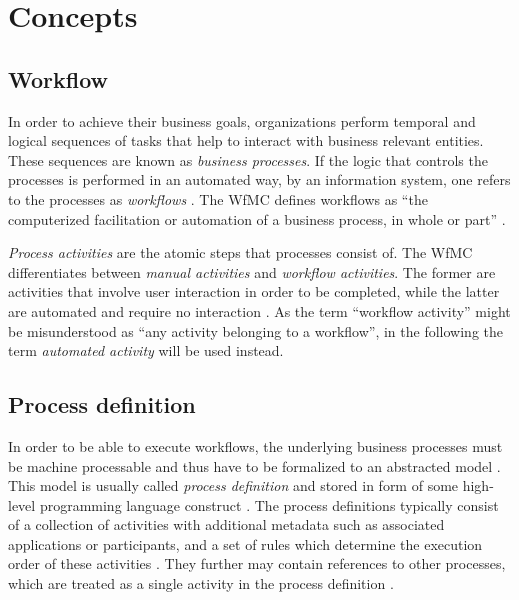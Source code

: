 
\section{Concepts} %
\label{sec:concepts}

  \subsection{Workflow} %
  \label{sub:workflow}
    In order to achieve their business goals, organizations perform temporal and logical sequences of tasks that help to interact with business relevant entities. These sequences are known as \emph{business processes}. If the logic that controls the processes is performed in an automated way, \eg by an information system, one refers to the processes as \emph{workflows} \cite{Becker1999Identifying,Hollingsworth1995Wfmc}. The \ac{WfMC} defines workflows as ``the computerized facilitation or automation of a business process, in whole or part'' \cite{Hollingsworth1995Wfmc}.

    \emph{Process activities} are the atomic steps that processes consist of. The \ac{WfMC} differentiates between \emph{manual activities} and \emph{workflow activities}. The former are activities that involve user interaction in order to be completed, while the latter are automated and require no interaction \cite{Hollingsworth1995Wfmc}. As the term ``workflow activity'' might be misunderstood as ``any activity belonging to a workflow'', in the following the term \emph{automated activity} will be used instead.

  \subsection{Process definition} %
  \label{sub:process_definition}
    In order to be able to execute workflows, the underlying business processes must be machine processable and thus have to be formalized to an abstracted model \cite{Hollingsworth1995Wfmc}. This model is usually called \emph{process definition} and stored in form of some high-level programming language construct \cite{Hollingsworth1995Wfmc,Wutke2008Model}.
    The process definitions typically consist of a collection of activities with additional metadata such as associated applications or participants, and a set of rules which determine the execution order of these activities \cite{Hollingsworth1995Wfmc}. They further may contain references to other processes, which are treated as a single activity in the process definition \cite{Hollingsworth1995Wfmc,Casati1999Specification}.


